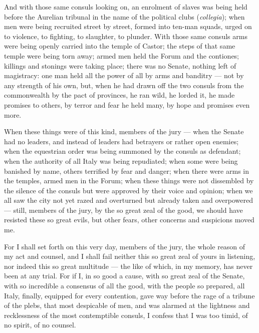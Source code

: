  And with those same consuls looking on, an enrolment of slaves was being held before the Aurelian tribunal in the name of the political clubs (\textit{collegia}); when men were being recruited street by street, formed into ten-man squads, urged on to violence, to fighting, to slaughter, to plunder. With those same consuls arms were being openly carried into the temple of Castor; the steps of that same temple were being torn away; armed men held the Forum and the contiones; killings and stonings were taking place; there was no Senate, nothing left of magistracy: one man held all the power of all by arms and banditry --- not by any strength of his own, but, when he had drawn off the two consuls from the commonwealth by the pact of provinces, he ran wild, he lorded it, he made promises to others, by terror and fear he held many, by hope and promises even more.

 When these things were of this kind, members of the jury --- when the Senate had no leaders, and instead of leaders had betrayers or rather open enemies; when the equestrian order was being summoned by the consuls as defendant; when the authority of all Italy was being repudiated; when some were being banished by name, others terrified by fear and danger; when there were arms in the temples, armed men in the Forum; when these things were not dissembled by the silence of the consuls but were approved by their voice and opinion; when we all saw the city not yet razed and overturned but already taken and overpowered --- still, members of the jury, by the so great zeal of the good, we should have resisted these so great evils, but other fears, other concerns and suspicions moved me.

 For I shall set forth on this very day, members of the jury, the whole reason of my act and counsel, and I shall fail neither this so great zeal of yours in listening, nor indeed this so great multitude --- the like of which, in my memory, has never been at any trial. For if I, in so good a cause, with so great zeal of the Senate, with so incredible a consensus of all the good, with the people so prepared, all Italy, finally, equipped for every contention, gave way before the rage of a tribune of the plebs, that most despicable of men, and was alarmed at the lightness and recklessness of the most contemptible consuls, I confess that I was too timid, of no spirit, of no counsel.

